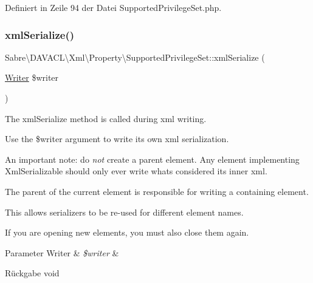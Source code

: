 Definiert in Zeile 94 der Datei Supported\+Privilege\+Set.\+php.

\mbox{\label{class_sabre_1_1_d_a_v_a_c_l_1_1_xml_1_1_property_1_1_supported_privilege_set_a5e25d40f4b72c1a0ec70d2137ec52b44}} 
\subsubsection{\texorpdfstring{xml\+Serialize()}{xmlSerialize()}}
{\footnotesize\ttfamily Sabre\textbackslash{}\+D\+A\+V\+A\+C\+L\textbackslash{}\+Xml\textbackslash{}\+Property\textbackslash{}\+Supported\+Privilege\+Set\+::xml\+Serialize (\begin{DoxyParamCaption}\item[{\mbox{\hyperlink{class_sabre_1_1_xml_1_1_writer}{Writer}}}]{\$writer }\end{DoxyParamCaption})}

The xml\+Serialize method is called during xml writing.

Use the \$writer argument to write its own xml serialization.

An important note\+: do {\itshape not} create a parent element. Any element implementing Xml\+Serializable should only ever write what\textquotesingle{}s considered its \textquotesingle{}inner xml\textquotesingle{}.

The parent of the current element is responsible for writing a containing element.

This allows serializers to be re-\/used for different element names.

If you are opening new elements, you must also close them again.


\begin{DoxyParams}[1]{Parameter}
Writer & {\em \$writer} & \\
\hline
\end{DoxyParams}
\begin{DoxyReturn}{Rückgabe}
void 
\end{DoxyReturn}


